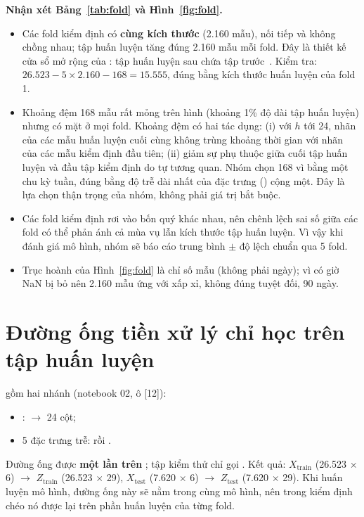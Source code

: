 \documentclass[../main.tex]{subfiles}
\begin{document}
\textbf{Nhận xét Bảng~\ref{tab:fold} và Hình~\ref{fig:fold}.}
\begin{itemize}
    \item Các fold kiểm định có \textbf{cùng kích thước} (2.160 mẫu), nối tiếp và không chồng nhau; tập huấn luyện tăng đúng 2.160 mẫu mỗi fold. Đây là thiết kế cửa sổ mở rộng của : tập huấn luyện sau chứa tập trước~\cite{sklearn2026tss}. Kiểm tra: $26.523 - 5 \times 2.160 - 168 = 15.555$, đúng bằng kích thước huấn luyện của fold 1.
    \item Khoảng đệm 168 mẫu rất mỏng trên hình (khoảng 1\% độ dài tập huấn luyện) nhưng có mặt ở mọi fold. Khoảng đệm có hai tác dụng: (i) với $h$ tới 24, nhãn của các mẫu huấn luyện cuối cùng không trùng khoảng thời gian với nhãn của các mẫu kiểm định đầu tiên; (ii) giảm sự phụ thuộc giữa cuối tập huấn luyện và đầu tập kiểm định do tự tương quan. Nhóm chọn 168 vì bằng một chu kỳ tuần, đúng bằng độ trễ dài nhất của đặc trưng () cộng một. Đây là lựa chọn thận trọng của nhóm, không phải giá trị bắt buộc.
    \item Các fold kiểm định rơi vào bốn quý khác nhau, nên chênh lệch sai số giữa các fold có thể phản ánh cả mùa vụ lẫn kích thước tập huấn luyện. Vì vậy khi đánh giá mô hình, nhóm sẽ báo cáo trung bình $\pm$ độ lệch chuẩn qua 5 fold.
    \item Trục hoành của Hình~\ref{fig:fold} là chỉ số mẫu (không phải ngày); vì có giờ NaN bị bỏ nên 2.160 mẫu ứng với xấp xỉ, không đúng tuyệt đối, 90 ngày.
\end{itemize}

\section{Đường ống tiền xử lý chỉ học trên tập huấn luyện}
\label{sec:pipeline}
 gồm hai nhánh (notebook 02, ô [12]):
\begin{itemize}
    \item {}:  $\rightarrow$ 24 cột;
    \item 5 đặc trưng trễ:  rồi .
\end{itemize}
Đường ống được  \textbf{một lần trên} ; tập kiểm thử chỉ gọi . Kết quả: $X_{\text{train}}$ (26.523 $\times$ 6) $\rightarrow$ $Z_{\text{train}}$ (26.523 $\times$ 29), $X_{\text{test}}$ (7.620 $\times$ 6) $\rightarrow$ $Z_{\text{test}}$ (7.620 $\times$ 29). Khi huấn luyện mô hình, đường ống này sẽ nằm trong  cùng mô hình, nên trong kiểm định chéo nó được  lại trên phần huấn luyện của từng fold.
\end{document}
